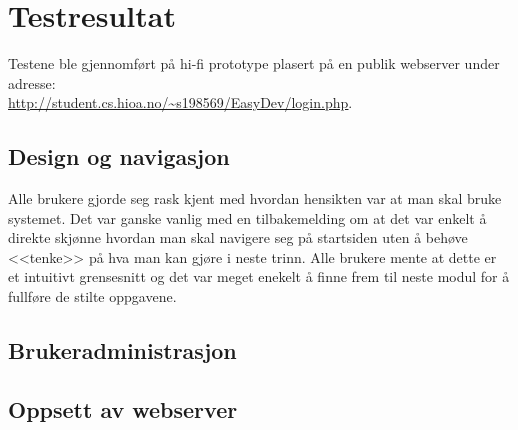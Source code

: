 \section{Testresultat}
Testene ble gjennomført på hi-fi prototype plasert på en publik webserver under adresse:\\ \href{http://student.cs.hioa.no/~s198569/EasyDev/login.php}{\underline{http://student.cs.hioa.no/\~{}s198569/EasyDev/login.php}}. 

\subsection{Design og navigasjon}
Alle brukere gjorde seg rask kjent med hvordan hensikten var at man skal bruke systemet. Det var ganske vanlig med en tilbakemelding om at det var enkelt å direkte skjønne hvordan man skal navigere seg på startsiden uten å behøve <<tenke>> på hva man kan gjøre i neste trinn. Alle brukere mente at dette er et intuitivt grensesnitt og det var meget enekelt å finne frem til neste modul for å fullføre de stilte oppgavene.

\subsection{Brukeradministrasjon}

\subsection{Oppsett av webserver}